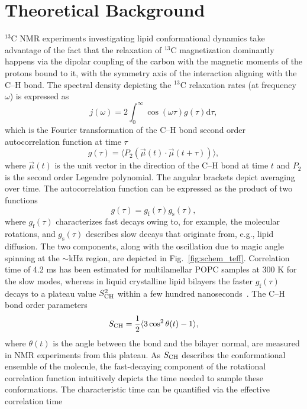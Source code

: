 \documentclass[journal=jpcbfk,manuscript=article,layout=twocolumn]{achemso}
\begin{document}
\section{Theoretical Background}\label{sec:theory}
$^{13}$C NMR experiments investigating lipid conformational dynamics take advantage of the fact that the relaxation of $^{13}$C magnetization dominantly happens via the dipolar coupling of the carbon with the magnetic moments of the protons bound to it, with the symmetry axis of the interaction aligning with the C--H bond. The spectral density depicting the $^{13}$C relaxation rates (at frequency $\omega$) is expressed as
\begin{equation}
j{(\omega)}=2\int_{0}^{\infty}\cos(\omega\tau)g(\tau)\mathrm d\tau ,
\end{equation}
which is the Fourier transformation of the C--H bond second order autocorrelation function at time $\tau$
\begin{equation}
\label{eq:BCF}
g(\tau)=\langle P_{2}\left(\vec{\mu}(t)\cdot \vec{\mu}(t+\tau)\right)\rangle ,
\end{equation}
where $\vec{\mu}(t)$ is the unit vector in the direction of the C--H bond at time $t$ and $P_{2}$ is the second order Legendre polynomial. The angular brackets depict averaging over time. The autocorrelation function can be expressed as the product of two functions
\begin{equation}
g(\tau)=g_{\mathrm{f}}(\tau)g_{\mathrm{s}}(\tau) ,
\end{equation} 
where $g_{\mathrm{f}}(\tau)$ characterizes fast decays owing to, for example, the molecular  rotations, and $g_{\mathrm{s}}(\tau)$ describes slow decays that originate from, e.g., lipid diffusion. The two components, along with the oscillation due to magic angle spinning at the $\sim$kHz region, are depicted in Fig.~\ref{fig:schem_teff}. Correlation time of 4.2 ms has been estimated for multilamellar POPC samples at 300 K for the slow modes, whereas  in liquid crystalline lipid bilayers the faster $g_{\mathrm{f}}(\tau)$ decays to a plateau value $S^{2}_{\rm{CH}}$ within a few hundred nanoseconds~\cite{ferreira15}. The C--H bond order parameters
\begin{equation}
\label{eq:OP}
S_{\rm{CH}}=\frac{1}{2}\langle 3\cos^{2}\theta(t)-1\rangle ,
\end{equation}
where $\theta(t)$ is the angle between the bond and the bilayer normal, are measured in NMR experiments from this plateau. As $S_{\rm{CH}}$ describes the conformational ensemble of the molecule, the fast-decaying component of the rotational correlation function intuitively depicts the time needed to sample these conformations. The characteristic time can be quantified via the effective correlation time
\end{document}

